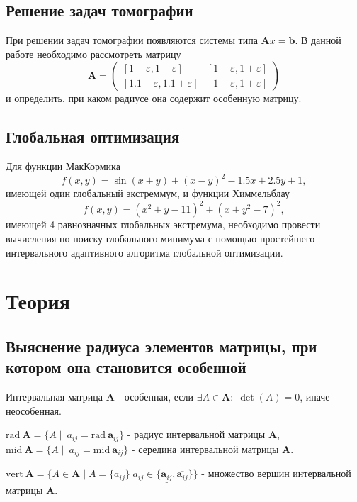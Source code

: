 \documentclass[a4paper]{article}
\begin{document}
\subsection{Решение задач томографии}
При решении задач томографии появляются системы типа $\mathbf{A}x=\mathbf{b}$. В данной работе необходимо рассмотреть матрицу 
\begin{equation}\label{math:tom}
\mathbf{A}=\begin{pmatrix}
  [1-\varepsilon,1+\varepsilon]& [1-\varepsilon,1+\varepsilon]\\
  [1.1-\varepsilon,1.1+\varepsilon]& [1-\varepsilon,1+\varepsilon]
\end{pmatrix}
\end{equation}
и определить, при каком радиусе она содержит особенную матрицу. 
\subsection{Глобальная оптимизация}
Для функции МакКормика
\begin{equation}\label{macCorm}
    f(x,y)=\sin(x+y)+(x-y)^2-1.5x+2.5y+1,
\end{equation}
имеющей один глобальный экстреммум, и функции Химмельблау
\begin{equation}\label{Himmel}
    f(x, y) = (x^2 + y - 11)^2 + (x + y^2 - 7)^2,
\end{equation}
имеющей 4 равнозначных глобальных экстремума, необходимо провести вычисления по поиску глобального минимума с помощью простейшего интервального адаптивного алгоритма глобальной оптимизации.
\section{Теория}
\subsection{Выяснение радиуса элементов матрицы, при котором она становится особенной}
Интервальная матрица $\mathbf{A}$ - особенная, если $\exists A\in\mathbf{A}:\;\det(A)=0$, иначе - неособенная. 

$\mathrm{rad}\:\mathbf{A}=\{A\mid\:a_{ij}=\mathrm{rad}\:\mathbf{a}_{ij}\}$ - радиус интервальной матрицы $\mathbf{A}$, $\mathrm{mid}\:\mathbf{A}=\{A\mid\:a_{ij}=\mathrm{mid}\:\mathbf{a}_{ij}\}$ - середина интервальной матрицы $\mathbf{A}$.

$\mathrm{vert}\:\mathbf{A}=\{A\in\mathbf{A}\mid A=\{a_{ij}\}\;a_{ij}\in\{\underline{\mathbf{a}_{ij}},\overline{\mathbf{a}_{ij}}\}\}$ - множество вершин интервальной матрицы $\mathbf{A}$. 
\end{document}
